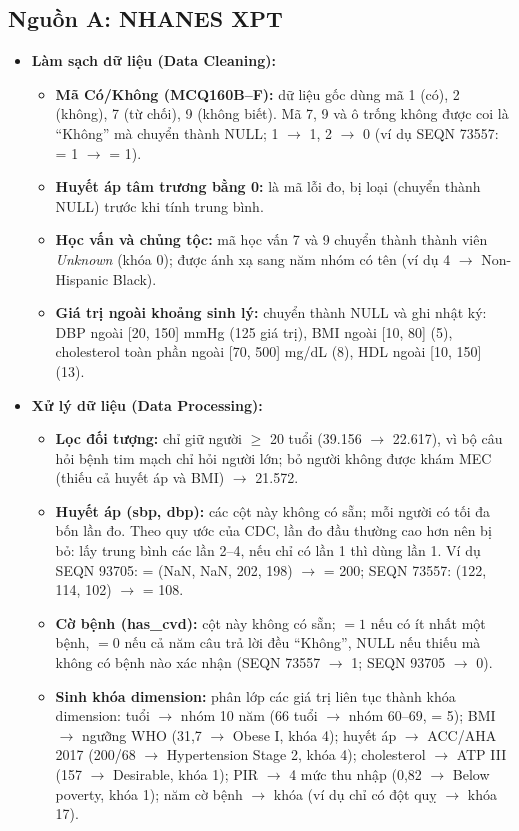 \subsection{Nguồn A: NHANES XPT}
\begin{itemize}
\item \textbf{Làm sạch dữ liệu (Data Cleaning):}
\begin{itemize}
\item \textbf{Mã Có/Không (MCQ160B--F):} dữ liệu gốc dùng mã 1 (có), 2 (không), 7 (từ chối), 9 (không biết). Mã 7, 9 và ô trống không được coi là ``Không'' mà chuyển thành NULL; 1 $\rightarrow$ 1, 2 $\rightarrow$ 0 (ví dụ SEQN 73557:  = 1 $\rightarrow$  = 1).
\item \textbf{Huyết áp tâm trương bằng 0:} là mã lỗi đo, bị loại (chuyển thành NULL) trước khi tính trung bình.
\item \textbf{Học vấn và chủng tộc:} mã học vấn 7 và 9 chuyển thành thành viên \emph{Unknown} (khóa 0);  được ánh xạ sang năm nhóm có tên (ví dụ 4 $\rightarrow$ Non-Hispanic Black).
\item \textbf{Giá trị ngoài khoảng sinh lý:} chuyển thành NULL và ghi nhật ký: DBP ngoài [20, 150] mmHg (125 giá trị), BMI ngoài [10, 80] (5), cholesterol toàn phần ngoài [70, 500] mg/dL (8), HDL ngoài [10, 150] (13).
\end{itemize}
\item \textbf{Xử lý dữ liệu (Data Processing):}
\begin{itemize}
\item \textbf{Lọc đối tượng:} chỉ giữ người $\geq$ 20 tuổi (39.156 $\rightarrow$ 22.617), vì bộ câu hỏi bệnh tim mạch chỉ hỏi người lớn; bỏ người không được khám MEC (thiếu cả huyết áp và BMI) $\rightarrow$ 21.572.
\item \textbf{Huyết áp (sbp, dbp):} các cột này không có sẵn; mỗi người có tối đa bốn lần đo. Theo quy ước của CDC, lần đo đầu thường cao hơn nên bị bỏ: lấy trung bình các lần 2--4, nếu chỉ có lần 1 thì dùng lần 1. Ví dụ SEQN 93705:  = (NaN, NaN, 202, 198) $\rightarrow$  = 200; SEQN 73557: (122, 114, 102) $\rightarrow$  = 108.
\item \textbf{Cờ bệnh (has\_cvd):} cột này không có sẵn; $= 1$ nếu có ít nhất một bệnh, $= 0$ nếu cả năm câu trả lời đều ``Không'', NULL nếu thiếu mà không có bệnh nào xác nhận (SEQN 73557 $\rightarrow$ 1; SEQN 93705 $\rightarrow$ 0).
\item \textbf{Sinh khóa dimension:} phân lớp các giá trị liên tục thành khóa dimension: tuổi $\rightarrow$ nhóm 10 năm (66 tuổi $\rightarrow$ nhóm 60--69,  = 5); BMI $\rightarrow$ ngưỡng WHO (31,7 $\rightarrow$ Obese I, khóa 4); huyết áp $\rightarrow$ ACC/AHA 2017 (200/68 $\rightarrow$ Hypertension Stage 2, khóa 4); cholesterol $\rightarrow$ ATP III (157 $\rightarrow$ Desirable, khóa 1); PIR $\rightarrow$ 4 mức thu nhập (0,82 $\rightarrow$ Below poverty, khóa 1); năm cờ bệnh $\rightarrow$ khóa  (ví dụ chỉ có đột quỵ $\rightarrow$ khóa 17).

\end{itemize}
\end{itemize}

